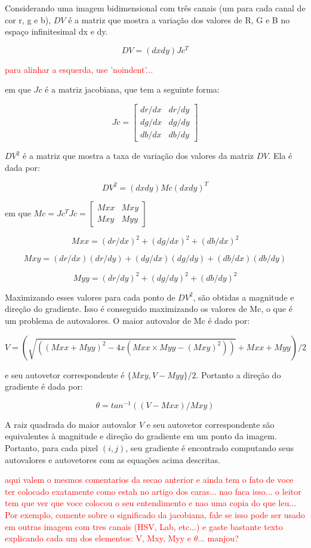 Considerando uma imagem bidimensional com três canais (um para cada canal de cor r, g e b), $DV$ é a matriz que mostra a variação dos valores de R, G e B no espaço infinitesimal dx e dy. 

$$ DV = (dx dy)Jc^T $$ 

\textcolor{red}{para alinhar a esquerda, use 'noindent'...}

em que $Jc$ é a matriz jacobiana, que tem a seguinte forma:

$$ Jc = \begin{bmatrix} dr/dx & dr/dy \\ dg/dx & dg/dy \\ db/dx & db/dy \end{bmatrix} $$

$ DV^2 $ é a matriz que mostra a taxa de variação dos valores da matriz $DV$. Ela é dada por:

$$ DV^2 = (dx dy)Mc(dx dy)^T $$

em que $ Mc = Jc^T Jc = \begin{bmatrix} Mxx & Mxy \\ Mxy & Myy \end{bmatrix}$

$$ Mxx = (dr/dx)^2+(dg/dx)^2+(db/dx)^2 $$

$$ Mxy = (dr/dx)(dr/dy)+(dg/dx)(dg/dy)+(db/dx)(db/dy) $$

$$ Myy = (dr/dy)^2+(dg/dy)^2+(db/dy)^2 $$

Maximizando esses valores para cada ponto de $ DV^2 $, são obtidas a magnitude e direção do gradiente. Isso é conseguido maximizando os valores de Mc, o que é um problema de autovalores. O maior autovalor de Mc é dado por:

$$ V = (\sqrt{( (Mxx+Myy)^2 - 4 x(Mxx \times Myy - (Mxy)^2 ) )}+Mxx+ Myy)/2 $$

e seu autovetor correspondente é $ \{Mxy,V-Myy\}/2 $. Portanto a direção do gradiente é dada por:

$$ \theta = tan^{-1}((V-Mxx)/Mxy) $$

A raiz quadrada do maior autovalor $V$ e seu autovetor correspondente são equivalentes à magnitude e direção do gradiente em um ponto da imagem. Portanto, para cada pixel $(i,j)$, seu gradiente é encontrado computando seus autovalores e autovetores com as equações acima descritas.

\textcolor{red}{aqui valem o mesmos comentarios da secao anterior e ainda tem o fato de voce ter colocado exatamente como estah no artigo dos caras... nao faca isso... o leitor tem que ver que voce colocou o seu entendimento e nao uma copia do que leu... Por exemplo, comente sobre o significado da jacobiana, fale se isso pode ser usado em outras imagem com tres canais (HSV, Lab, etc...) e gaste bastante texto explicando cada um dos elementos: V, Mxy, Myy e $\theta$... manjou?}



